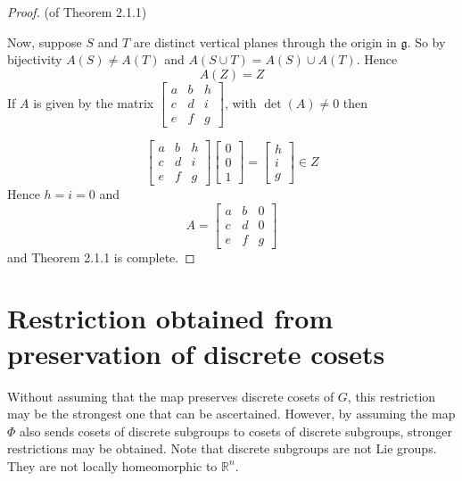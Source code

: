 \documentclass[honours]{UNSWthesis}
\newcommand{\R}{\mathbb{R}}
\newcommand{\g}{\mathfrak{g}}
\newcommand{\1}{\mathbf{e}_{1}}
\newcommand{\2}{\mathbf{e}_{3}}
\newcommand{\3}{\mathbf{e}_{3}}
\begin{document}
\begin{proof}(of Theorem 2.1.1)

Now, suppose $S$ and $T$ are distinct vertical planes through the origin in $\g$. So by bijectivity $A(S) \neq A(T)$ and $A(S \cup T)=A(S) \cup A(T)$. Hence 
\[
A(Z)=Z
\]
If $A$ is given by the matrix 
$\begin{bmatrix}
a & b & h \\
c & d & i \\
e & f & g
\end{bmatrix}
$, with $\det(A) \neq 0$ then 

\[
\begin{bmatrix}
a & b & h \\
c & d & i \\
e & f & g
\end{bmatrix} 
\begin{bmatrix}
0 \\ 0 \\ 1
\end{bmatrix} =
\begin{bmatrix}
h \\ i \\ g
\end{bmatrix} 
\in Z
\]
Hence $h=i=0$ and 
\[
A=
\begin{bmatrix}
a & b & 0 \\
c & d & 0 \\
e & f & g
\end{bmatrix}
\]
and Theorem 2.1.1 is complete.
\end{proof}

\section{Restriction obtained from preservation of discrete cosets}
Without assuming that the map preserves discrete cosets of $G$, this restriction may be the strongest one that can be ascertained. However, by assuming the map $\Phi$ also sends cosets of discrete subgroups to cosets of discrete subgroups, stronger restrictions may be obtained. Note that discrete subgroups are not Lie groups. They are not locally homeomorphic to $\R^{n}$. 
\end{document}

